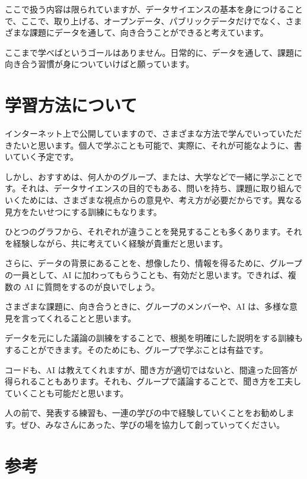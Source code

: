 \documentclass[
  xelatex, ja=standard]{bxjsbook}
\theoremstyle{definition}
\theoremstyle{definition}
\theoremstyle{definition}
\theoremstyle{definition}
\theoremstyle{remark}
\begin{document}
ここで扱う内容は限られていますが、データサイエンスの基本を身につけることで、ここで、取り上げる、オープンデータ、パブリックデータだけでなく、さまざまな課題にデータを通して、向き合うことができると考えています。

ここまで学べばというゴールはありません。日常的に、データを通して、課題に向き合う習慣が身についていけばと願っています。

\hypertarget{ux5b66ux7fd2ux65b9ux6cd5ux306bux3064ux3044ux3066}{%
\section{学習方法について}\label{ux5b66ux7fd2ux65b9ux6cd5ux306bux3064ux3044ux3066}}

インターネット上で公開していますので、さまざまな方法で学んでいっていただきたいと思います。個人で学ぶことも可能で、実際に、それが可能なように、書いていく予定です。

しかし、おすすめは、何人かのグループ、または、大学などで一緒に学ぶことです。それは、データサイエンスの目的でもある、問いを持ち、課題に取り組んでいくためには、さまざまな視点からの意見や、考え方が必要だからです。異なる見方をたいせつにする訓練にもなります。

ひとつのグラフから、それぞれが違うことを発見することも多くあります。それを経験しながら、共に考えていく経験が貴重だと思います。

さらに、データの背景にあることを、想像したり、情報を得るために、グループの一員として、AI に加わってもらうことも、有効だと思います。できれば、複数の AI に質問をするのが良いでしょう。

さまざまな課題に、向き合うときに、グループのメンバーや、AI は、多様な意見を言ってくれることと思います。

データを元にした議論の訓練をすることで、根拠を明確にした説明をする訓練もすることができます。そのためにも、グループで学ぶことは有益です。

コードも、AI は教えてくれますが、聞き方が適切ではないと、間違った回答が得られることもあります。それも、グループで議論することで、聞き方を工夫していくことも可能だと思います。

人の前で、発表する練習も、一連の学びの中で経験していくことをお勧めします。ぜひ、みなさんにあった、学びの場を協力して創っていってください。

\hypertarget{ux53c2ux8003-1}{%
\section{参考}\label{ux53c2ux8003-1}}
\end{document}

